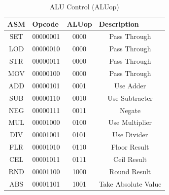 \documentclass[a4paper,14pt]{article}
\begin{document}
\begin{table}[!h]
\centering
\caption*{ALU Control (ALUop)}
\begin{tabular}{llll}
ASM & Opcode & ALUop & Description \\ \hline
\multicolumn{1}{|c|}{SET} & \multicolumn{1}{c|}{00000001} & \multicolumn{1}{c|}{0000} & \multicolumn{1}{c|}{Pass Through} \TBstrut \\[1em] \hline
\multicolumn{1}{|c|}{LOD} & \multicolumn{1}{c|}{00000010} & \multicolumn{1}{c|}{0000} & \multicolumn{1}{c|}{Pass Through} \TBstrut \\[1em] \hline
\multicolumn{1}{|c|}{STR} & \multicolumn{1}{c|}{00000011} & \multicolumn{1}{c|}{0000} & \multicolumn{1}{c|}{Pass Through} \TBstrut \\[1em] \hline
\multicolumn{1}{|c|}{MOV} & \multicolumn{1}{c|}{00000100} & \multicolumn{1}{c|}{0000} & \multicolumn{1}{c|}{Pass Through} \TBstrut \\[1em] \hline 
\multicolumn{1}{|c|}{ADD} & \multicolumn{1}{c|}{00000101} & \multicolumn{1}{c|}{0001} & \multicolumn{1}{c|}{Use Adder} \TBstrut \\[1em] \hline
\multicolumn{1}{|c|}{SUB} & \multicolumn{1}{c|}{00000110} & \multicolumn{1}{c|}{0010} & \multicolumn{1}{c|}{Use Subtracter} \TBstrut \\[1em] \hline
\multicolumn{1}{|c|}{NEG} & \multicolumn{1}{c|}{00000111} & \multicolumn{1}{c|}{0011} & \multicolumn{1}{c|}{Negate} \TBstrut \\[1em] \hline
\multicolumn{1}{|c|}{MUL} & \multicolumn{1}{c|}{00001000} & \multicolumn{1}{c|}{0100} & \multicolumn{1}{c|}{Use Multiplier} \TBstrut \\[1em] \hline
\multicolumn{1}{|c|}{DIV} & \multicolumn{1}{c|}{00001001} & \multicolumn{1}{c|}{0101} & \multicolumn{1}{c|}{Use Divider} \TBstrut \\[1em] \hline
\multicolumn{1}{|c|}{FLR} & \multicolumn{1}{c|}{00001010} & \multicolumn{1}{c|}{0110} & \multicolumn{1}{c|}{Floor Result} \TBstrut \\[1em] \hline
\multicolumn{1}{|c|}{CEL} & \multicolumn{1}{c|}{00001011} & \multicolumn{1}{c|}{0111} & \multicolumn{1}{c|}{Ceil Result} \TBstrut \\[1em] \hline
\multicolumn{1}{|c|}{RND} & \multicolumn{1}{c|}{00001100} & \multicolumn{1}{c|}{1000} & \multicolumn{1}{c|}{Round Result} \TBstrut \\[1em] \hline
\multicolumn{1}{|c|}{ABS} & \multicolumn{1}{c|}{00001101} & \multicolumn{1}{c|}{1001} & \multicolumn{1}{c|}{Take Absolute Value} \TBstrut \\[1em] \hline

\end{tabular}
\end{table}
\end{document}
